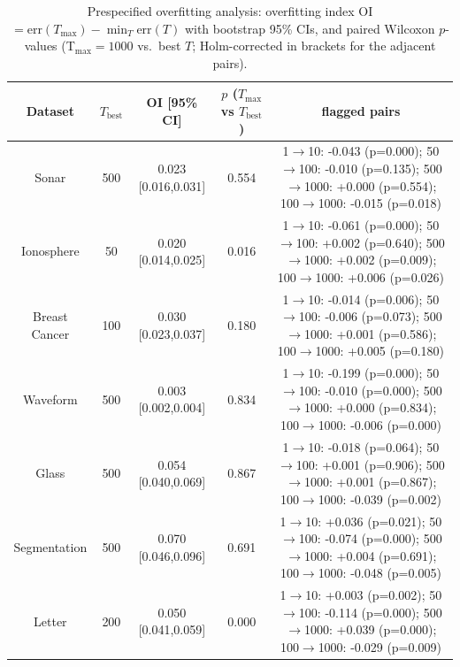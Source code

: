 \begin{table}[!ht]
\caption{Prespecified overfitting analysis: overfitting index OI $= \mathrm{err}(T_{\max})-\min_T \mathrm{err}(T)$ with bootstrap 95\% CIs, and paired Wilcoxon $p$-values (T$_{\max}{=}1000$ vs.\ best $T$; Holm-corrected in brackets for the adjacent pairs).}\label{tb4}
\begin{tabular}{|c|c|c|c|c|}
\hline
Dataset & $T_{\text{best}}$ & OI [95\% CI] & $p$ ($T_{\max}$ vs $T_{\text{best}}$) & flagged pairs \\ \hline
Sonar & 500 & 0.023 [0.016,0.031] & 0.554 & 1$\to$10: -0.043 (p=0.000); 50$\to$100: -0.010 (p=0.135); 500$\to$1000: +0.000 (p=0.554); 100$\to$1000: -0.015 (p=0.018) \\
Ionosphere & 50 & 0.020 [0.014,0.025] & 0.016 & 1$\to$10: -0.061 (p=0.000); 50$\to$100: +0.002 (p=0.640); 500$\to$1000: +0.002 (p=0.009); 100$\to$1000: +0.006 (p=0.026) \\
Breast Cancer & 100 & 0.030 [0.023,0.037] & 0.180 & 1$\to$10: -0.014 (p=0.006); 50$\to$100: -0.006 (p=0.073); 500$\to$1000: +0.001 (p=0.586); 100$\to$1000: +0.005 (p=0.180) \\
Waveform & 500 & 0.003 [0.002,0.004] & 0.834 & 1$\to$10: -0.199 (p=0.000); 50$\to$100: -0.010 (p=0.000); 500$\to$1000: +0.000 (p=0.834); 100$\to$1000: -0.006 (p=0.000) \\
Glass & 500 & 0.054 [0.040,0.069] & 0.867 & 1$\to$10: -0.018 (p=0.064); 50$\to$100: +0.001 (p=0.906); 500$\to$1000: +0.001 (p=0.867); 100$\to$1000: -0.039 (p=0.002) \\
Segmentation & 500 & 0.070 [0.046,0.096] & 0.691 & 1$\to$10: +0.036 (p=0.021); 50$\to$100: -0.074 (p=0.000); 500$\to$1000: +0.004 (p=0.691); 100$\to$1000: -0.048 (p=0.005) \\
Letter & 200 & 0.050 [0.041,0.059] & 0.000 & 1$\to$10: +0.003 (p=0.002); 50$\to$100: -0.114 (p=0.000); 500$\to$1000: +0.039 (p=0.000); 100$\to$1000: -0.029 (p=0.009) \\
\hline
\end{tabular}
\end{table}

